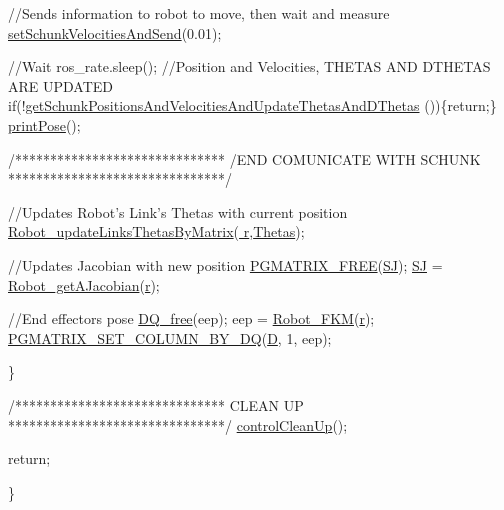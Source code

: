 \begin{DoxyCode}
                \textcolor{comment}{//Sends information to robot to move, then wait and measure}
                \hyperlink{classCartesian__controller_a40d17a9794af8a9a607618bf0ee5efff}{setSchunkVelocitiesAndSend}(0.01);

                \textcolor{comment}{//Wait}
                ros\_rate.sleep();
                \textcolor{comment}{//Position and Velocities, THETAS AND DTHETAS ARE UPDATED}
                \textcolor{keywordflow}{if}(!\hyperlink{classCartesian__controller_a0d7a63bac84715f6742db738df246f91}{getSchunkPositionsAndVelocitiesAndUpdateThetasAndDThetas}
      ())\{\textcolor{keywordflow}{return};\}
                \hyperlink{classCartesian__pose__controller_ab55ab40074c82ba8cc010fe68fc76d5b}{printPose}();

                \textcolor{comment}{/******************************}
\textcolor{comment}{                /END    COMUNICATE WITH SCHUNK}
\textcolor{comment}{                *******************************/}

                \textcolor{comment}{//Updates Robot's Link's Thetas with current position}
                \hyperlink{robot_8h_aa1d3aca5132bd5f347f5966d38fbb966}{Robot\_updateLinksThetasByMatrix}(\hyperlink{classCartesian__controller_a5562129951bd802e4ded77fc716c87a0}{
      r},\hyperlink{classCartesian__controller_a0a0f818dad601cd9e3e26cb6959b8eb6}{Thetas});

                \textcolor{comment}{//Updates Jacobian with new position}
                \hyperlink{gmatrix_8h_a9a73b4e0a77f386c0bae1bba75298d1d}{PGMATRIX\_FREE}(\hyperlink{classCartesian__controller_a98fdac06d136ac3dba0102d97cd5dd36}{SJ});
                \hyperlink{classCartesian__controller_a98fdac06d136ac3dba0102d97cd5dd36}{SJ}  = \hyperlink{robot_8h_ab6dd42296709cf38d3468af7afd29563}{Robot\_getAJacobian}(\hyperlink{classCartesian__controller_a5562129951bd802e4ded77fc716c87a0}{r});

                \textcolor{comment}{//End effectors pose}
                \hyperlink{dualquaternion_8h_a1d21b6cb665c04de4be5aca50804caf4}{DQ\_free}(eep);
                eep = \hyperlink{robot_8h_a57cc252fbb9e4c8be955b6af755b0c2c}{Robot\_FKM}(\hyperlink{classCartesian__controller_a5562129951bd802e4ded77fc716c87a0}{r});
                \hyperlink{dualquaternion_8h_a3d48348c3e25d1724058c2cf2364e42e}{PGMATRIX\_SET\_COLUMN\_BY\_DQ}(\hyperlink{classCartesian__controller_a8c470b652ce436d8e48f126073fc2593}{D}, 1, eep);

        \}


        \textcolor{comment}{/******************************}
\textcolor{comment}{                        CLEAN UP}
\textcolor{comment}{        *******************************/}
        \hyperlink{classCartesian__controller_a8c0f0b41de9f4f8b2e3aa327e7c6b50c}{controlCleanUp}();

        \textcolor{keywordflow}{return};

\}
\end{DoxyCode}
